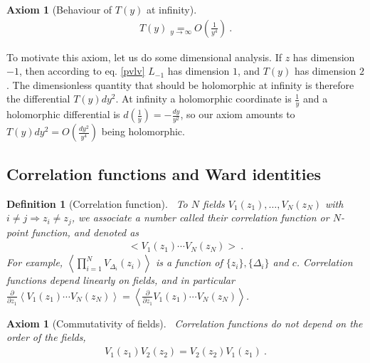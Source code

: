 \documentclass[12pt, a4paper]{article}
\theoremstyle{break}
\newtheorem{hyp}[exo]{Axiom}
\newtheorem{defn}[exo]{Definition}
\begin{document}
\begin{hyp}[Behaviour of $T(y)$ at infinity]
~\label{hyp:ti}
 \begin{align}
 T(y) \underset{y\to\infty} = O\left(\frac{1}{y^4}\right)\ .
 \label{eq:tinf}
\end{align}
\end{hyp}
To motivate this axiom, let us do some dimensional analysis. If $z$ has dimension $-1$, then according to eq. \eqref{pvlv} $L_{-1}$ has dimension $1$, and $T(y)$ has dimension $2$. The dimensionless quantity that should be holomorphic at infinity is therefore the differential $T(y)dy^2$. At infinity a holomorphic coordinate is $\frac{1}{y}$ and a holomorphic differential is $d(\frac{1}{y}) = -\frac{dy}{y^2}$, so our axiom amounts to $T(y)dy^2= O(\frac{dy^2}{y^4})$ being holomorphic.


\subsection{Correlation functions and Ward identities}

\begin{defn}[Correlation function]
~\label{def:cor}
 To $N$ fields $V_1(z_1), \dots ,V_N(z_N)$ with $i\neq j\Rightarrow z_i\neq z_j$, we associate a number called their correlation function or $N$-point function, and denoted as 
 \begin{align}
  \Big< V_1(z_1) \cdots V_N(z_N) \Big>\ .
 \end{align}
For example, $\left< \prod_{i=1}^N V_{\Delta_i}(z_i) \right>$ is a function of $\{z_i\}, \{\Delta_i\}$ and $c$.
Correlation functions depend linearly on fields, and in particular $\frac{\partial}{\partial z_1} \left< V_1(z_1) \cdots V_N(z_N) \right> = \left< \frac{\partial}{\partial z_1}V_1(z_1) \cdots V_N(z_N) \right>$.
\end{defn}

\begin{hyp}[Commutativity of fields]
 ~\label{hyp:ass}
 Correlation functions do not depend on the order of the fields,
 \begin{align}
  V_1(z_1) V_2(z_2) = V_2(z_2)V_1(z_1)\ .
 \end{align}
\end{hyp}
\end{document}
